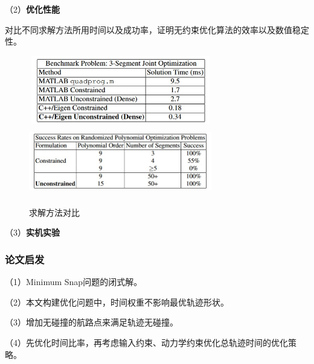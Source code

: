 （2）\textbf{优化性能}


    对比不同求解方法所用时间以及成功率，证明无约束优化算法的效率以及数值稳定性。
    \begin{figure}[htbp]
        \centering
        \includegraphics[width=8cm, height=3cm]{image/poly4.jpg}
        \includegraphics[width=8cm, height=3cm]{image/poly5.jpg}
        \caption{求解方法对比}\label{poly4}
    \end{figure}


（3）\textbf{实机实验}

\subsubsection{论文启发}
（1）Minimum Snap问题的闭式解。


（2）本文构建优化问题中，时间权重不影响最优轨迹形状。


（3）增加无碰撞的航路点来满足轨迹无碰撞。


（4）先优化时间比率，再考虑输入约束、动力学约束优化总轨迹时间的优化策略。